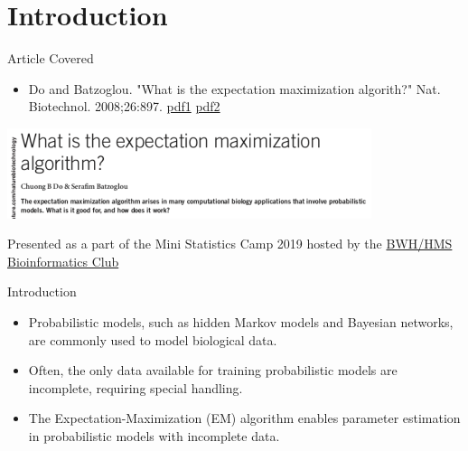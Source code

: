 \documentclass[dvipdfmx,bigger,aspectratio=169]{beamer}
\begin{document}
\section{Introduction}
\label{sec:org3b10e7a}
\begin{frame}[label={sec:org8f55be3}]{Article Covered}
\begin{itemize}
\item Do and Batzoglou. "What is the expectation maximization algorith?" Nat. Biotechnol. 2008;26:897. \cite{doWhatExpectationMaximization2008} \href{https://www.cmi.ac.in/\~madhavan/courses/dmml2019jan/literature/EM\_algorithm\_2coin\_example.pdf}{pdf1} \href{http://www.utdallas.edu/\~prr105020/biol6385/2019/lecture/lecture\_4\_em\_paper.pdf}{pdf2}
\end{itemize}
\begin{center}
\includegraphics[page=1,keepaspectratio,width=0.8\textwidth]{./source/em_algo.png}
\end{center}
\footnotesize
Presented as a part of the Mini Statistics Camp 2019 hosted by the \href{http://bioinformatics.bwh.harvard.edu}{BWH/HMS Bioinformatics Club}
\end{frame}

\begin{frame}[label={sec:orgf6c304e}]{Introduction}
\begin{itemize}
\item Probabilistic models, such as hidden Markov models and Bayesian networks, are commonly used to model biological data.
\end{itemize}


\begin{itemize}
\item Often, the only data available for training probabilistic models are incomplete, requiring special handling.
\end{itemize}


\begin{itemize}
\item The Expectation-Maximization (EM) algorithm enables parameter estimation in probabilistic models with incomplete data.
\end{itemize}
\end{frame}
\end{document}
